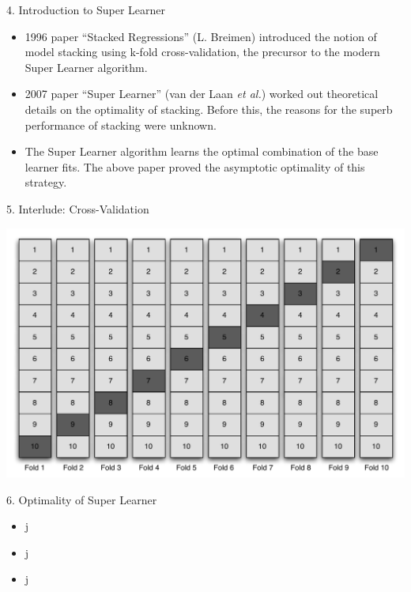 \documentclass[12pt,t,handout]{beamer}
\begin{document}
\begin{frame}[c]{4. Introduction to Super Learner}

\vspace*{3mm}

\centering

  \begin{itemize}
    \itemsep12pt
    \item 1996 paper ``Stacked Regressions'' (L. Breimen) introduced the notion
          of model stacking using k-fold cross-validation, the precursor to the
          modern Super Learner algorithm.
    \item 2007 paper ``Super Learner'' (van der Laan \textit{et al.}) worked out
          theoretical details on the optimality of stacking. Before this, the
          reasons for the superb performance of stacking were unknown.
    \item The Super Learner algorithm learns the optimal combination of the
          base learner fits. The above paper proved the asymptotic optimality
          of this strategy.
  \end{itemize}

\note{
}
\end{frame}


\begin{frame}[c]{5. Interlude: Cross-Validation}

\vspace*{3mm}

\centering

\includegraphics[scale=0.45]{Figs/cv.pdf}

\note{
}
\end{frame}


\begin{frame}[c]{6. Optimality of Super Learner}

\vspace*{3mm}

\centering

  \begin{itemize}
    \itemsep12pt
    \item j
    \item j
    \item j
  \end{itemize}

\note{
}
\end{frame}
\end{document}
